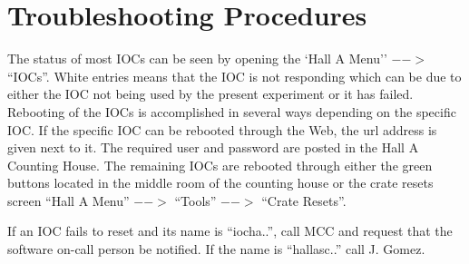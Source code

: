 {\section{Troubleshooting Procedures}
The status of most IOCs can be seen
by opening the `Hall A Menu'' $-->$ ``IOCs''. White entries means that the IOC
is not responding which can be due to either the IOC not being used by the present
experiment or it has failed. Rebooting of the IOCs is accomplished in several ways
depending on the specific IOC. If the specific IOC can be rebooted through the
Web, the url address is given next to it. The required user and password are
posted in the Hall A Counting House. The remaining IOCs are rebooted through
either the green buttons located in the middle room of the counting house
or the crate resets screen ``Hall A Menu'' $-->$ ``Tools'' $-->$ ``Crate Resets''.

If an IOC fails to reset and its name is ``iocha..'', call MCC and request that
the software on-call person be notified. If the name is ``hallasc..'' call J. Gomez.

}


%
%
%
%
%
%
%
%
%
